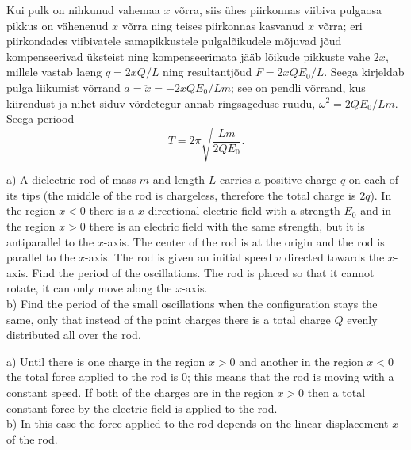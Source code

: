 {\osa Kui pulk on nihkunud vahemaa $x$ võrra, siis ühes piirkonnas viibiva pulgaosa pikkus
on vähenenud $x$ võrra ning teises piirkonnas kasvanud $x$ võrra; eri piirkondades viibivatele
samapikkustele pulgalõikudele mõjuvad jõud kompenseerivad üksteist  ning kompenseerimata jääb lõikude pikkuste vahe $2x$, millele vastab laeng
$q=2xQ/L$ ning resultantjõud $F=2xQE_0/L$.
Seega kirjeldab pulga liikumist võrrand $a=\ddot x= -2xQE_0/Lm$;
see on pendli võrrand, kus kiirendust ja nihet siduv võrdetegur annab ringsageduse ruudu,
$\omega^2=2QE_0/Lm$. Seega periood 
\[ T=2\pi\sqrt{\frac{Lm}{2QE_0}}.\]
\fi


\ifEngStatement
a) A dielectric rod of mass $m$ and length $L$ carries a positive charge $q$ on each of its tips (the middle of the rod is chargeless, therefore the total charge is $2q$). In the region $x<0$ there is a $x$-directional electric field with a strength $E_0$ and in the region $x>0$ there is an electric field with the same strength, but it is antiparallel to the $x$-axis. The center of the rod is at the origin and the rod is parallel to the $x$-axis. The rod is given an initial speed $v$ directed towards the $x$-axis. Find the period of the oscillations. The rod is placed so that it cannot rotate, it can only move along the $x$-axis.\\
b) Find the period of the small oscillations when the configuration stays the same, only that instead of the point charges there is a total charge $Q$ evenly distributed all over the rod.
\fi


\ifEngHint
a) Until there is one charge in the region $x>0$ and another in the region $x<0$ the total force applied to the rod is 0; this means that the rod is moving with a constant speed. If both of the charges are in the region $x>0$ then a total constant force by the electric field is applied to the rod.\\
b) In this case the force applied to the rod depends on the linear displacement $x$ of the rod.
\fi


}
